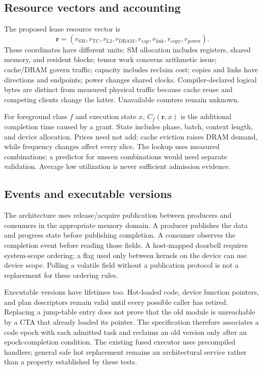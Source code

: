 \subsection{Resource vectors and accounting}
The proposed lease resource vector is
\begin{equation}
 \mathbf r=(r_{\mathrm{SM}},r_{\mathrm{TC}},r_{\mathrm{L2}},r_{\mathrm{DRAM}},
 r_{\mathrm{cap}},r_{\mathrm{link}},r_{\mathrm{copy}},r_{\mathrm{power}}).
\end{equation}
These coordinates have different units: SM allocation includes registers,
shared memory, and resident blocks; tensor work concerns arithmetic issue;
cache/DRAM govern traffic; capacity includes reclaim cost; copies and links
have directions and endpoints; power changes shared clocks. Compiler-declared
logical bytes are distinct from measured physical traffic because cache reuse
and competing clients change the latter. Unavailable counters remain unknown.

For foreground class $f$ and execution state $x$, $C_f(\mathbf r,x)$ is the
additional completion time caused by a grant. State includes phase, batch,
context length, and device allocation. Prices need not add: cache eviction
raises DRAM demand, while frequency changes affect every slice. The lookup
uses measured combinations; a predictor for unseen combinations would need
separate validation. Average low utilization is never sufficient admission
evidence.

\subsection{Events and executable versions}
The architecture uses release/acquire publication between producers and
consumers in the appropriate memory domain. A producer publishes the data
and progress state before publishing completion. A consumer observes the
completion event before reading those fields. A host-mapped doorbell requires
system-scope ordering; a flag used only between kernels on the device can use
device scope. Polling a volatile field without a publication protocol is not
a replacement for these ordering rules.

Executable versions have lifetimes too. Hot-loaded code, device function
pointers, and plan descriptors remain valid until every possible caller has
retired. Replacing a jump-table entry does not prove that the old module is
unreachable by a CTA that already loaded its pointer. The specification
therefore associates a code epoch with each admitted task and reclaims an
old version only after an epoch-completion condition. The existing fused
executor uses precompiled handlers; general safe hot replacement remains
an architectural service rather than a property established by these tests.

